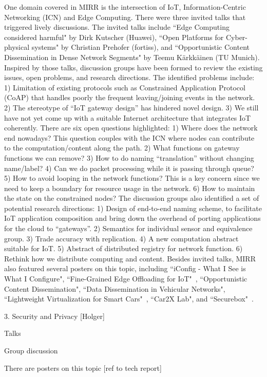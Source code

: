 One domain covered in MIRR is the intersection of IoT, Information-Centric
Networking (ICN) and Edge Computing. There were three invited talks that triggered
lively discussions. The invited talks include 
``Edge Computing considered harmful" by Dirk Kutscher (Huawei), 
``Open Platforms for Cyber-physical systems" by Christian Prehofer (fortiss),
and ``Opportunistic Content Dissemination in Dense Network Segments"
by Teemu Kärkkäinen (TU Munich). Inspired by those talks, discussion groups
have been formed to review the existing issues, open problems, and 
research directions. The identified problems include: 1) Limitation
of existing protocols such as Constrained Application Protocol (CoAP) that
handles poorly the frequent leaving/joining events in the network. 2) The
stereotype of ``IoT gateway design'' has hindered novel design. 3) We still
have not yet come up with a suitable Internet architecture that integrates
IoT coherently. There are six open questions highlighted: 1) Where does the network
end nowadays? This question couples
with the ICN where nodes can contribute to the computation/content along
the path. 2) What functions on gateway functions we can remove? 3) How to do
naming ``translation'' without changing name/label? 4) Can we do packet
processing while it is passing through queue? 5) How to avoid looping in
the network functions? This is a key concern since we need to keep a
boundary for resource usage in the network. 6) How to maintain the state on
the constrained nodes? The discussion groups also identified a set of potential
research directions: 1) Design of end-to-end naming scheme, to facilitate IoT
application composition and bring down the overhead of porting applications
for the cloud to ``gateways''. 2) Semantics for individual sensor and
equivalence group. 3) Trade accuracy with replication. 4) A new computation
abstract suitable for IoT. 5) Abstract of distributed registry for network
function. 6) Rethink how we distribute computing and content.
Besides invited talks, MIRR also featured several posters on this topic, including
``iConfig - What I See is What I Configure", 
``Fine-Grained Edge Offloading for IoT"~\cite{cozzolino:hotconnet:2017},
``Opportunistic Content Dissemination",
``Data Dissemination in Vehicular Networks",
``Lightweight Virtualization for Smart Cars"~\cite{rmorabito:im:2017},
``Car2X Lab", and ``Securebox"~\cite{hafeez:can:2016}.


3. Security and Privacy [Holger]

Talks

Group discussion

There are posters on this topic [ref to tech report]